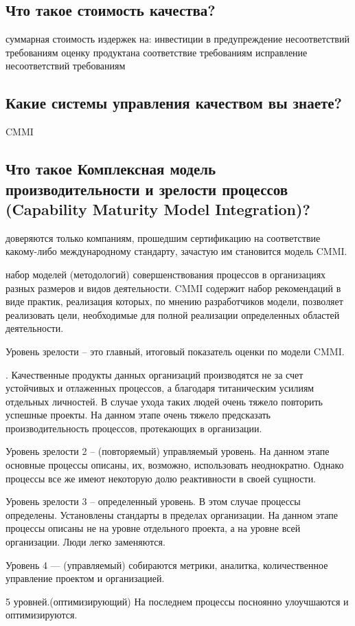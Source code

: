 \subsection{Что такое стоимость качества?}

суммарная стоимость издержек на:
инвестиции в предупреждение несоответствий требованиям
оценку продукта на соответствие требованиям
исправление несоответствий требованиям

\subsection{Какие системы управления качеством вы знаете?}

CMMI

\subsection{Что такое Комплексная модель производительности и зрелости
процессов (Capability Maturity Model Integration)?}

доверяются только компаниям, прошедшим сертификацию на соответствие какому-либо
международному стандарту, зачастую им становится модель CMMI.

 набор моделей (методологий) совершенствования процессов в организациях разных
 размеров и видов деятельности. CMMI содержит набор рекомендаций в виде
 практик, реализация которых, по мнению разработчиков модели, позволяет
 реализовать цели, необходимые для полной реализации определенных областей
 деятельности.


 Уровень зрелости – это главный, итоговый показатель оценки по модели CMMI.

 . Качественные продукты данных организаций производятся не за счет устойчивых
 и отлаженных процессов, а благодаря титаническим усилиям отдельных личностей.
 В случае ухода таких людей очень тяжело повторить успешные проекты. На данном
 этапе очень тяжело предсказать производительность процессов, протекающих в
 организации.

 Уровень зрелости 2 – (повторяемый) управляемый уровень. На данном этапе основные процессы
 описаны, их, возможно, использовать неоднократно.  Однако процессы все же
 имеют некоторую долю реактивности в своей сущности. 

 Уровень зрелости 3 – определенный уровень. В этом случае процессы определены.
 Установлены стандарты в пределах организации. На данном этапе процессы описаны
 не на уровне отдельного проекта, а на уровне всей организации. Люди легко
 заменяются.

 Уровень 4 --- (управляемый) собираются метрики, аналитка, количественное управление проектом
и организацией.

5 уровней.(оптимизирующий) На последнем процессы посноянно улоучшаются и оптимизируются.


